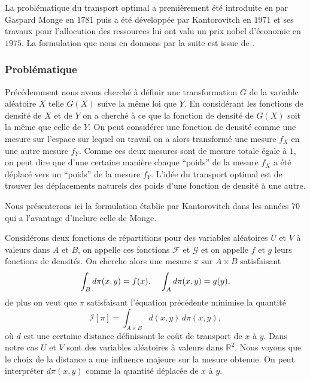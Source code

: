 \documentclass[a4paper,11pt]{article}
\numberwithin{equation}{section}
\begin{document}
La problématique du transport optimal a premièrement été introduite en par Gaspard Monge en 1781 puis a été développée par Kantorovitch en $1971$ et ses travaux pour l'allocution des ressources lui ont valu un prix nobel d'économie en $1975$. La formulation que nous en donnons par la suite est issue de \cite{villani2003topics}.

\subsubsection{Problématique}
\label{ch:s-Problematique}

Précédemment nous avons cherché à définir une transformation $G$ de la variable aléatoire $X$ telle $G(X)$ suive la même loi que $Y$. En considérant les fonctions de densité de $X$ et de $Y$ on a cherché à ce que la fonction de densité de $G(X)$ soit la même que celle de $Y$. On peut considérer une fonction de densité comme une mesure sur l'espace sur lequel on travail on a alors transformé une mesure $f_X$ en une autre mesure $f_Y$. Comme ces deux mesures sont de mesure totale égale à $1$, on peut dire que d'une certaine manière chaque ``poids'' de la mesure $f_X$ a été déplacé vers un ``poids'' de la mesure $f_Y$. L'idée du transport optimal est de trouver les déplacements naturels des poids d'une fonction de densité à une autre.  

Nous présenterons ici la formulation établie par Kantorovitch dans les années $70$ qui a l'avantage d'inclure celle de Monge.

Considérons deux fonctions de répartitions pour des variables aléatoires $U$ et $V$ à valeurs dans $A$ et $B$, on appelle ces fonctions $\mathcal{F}$ et $\mathcal{G}$ et on appelle $f$ et $g$ leurs fonctions de densités. On cherche alors une mesure $\pi$ sur  $A \times B$ satisfaisant
\[\int_{B} d\pi(x,y)= f(x), \hspace{4mm} \int_{A}  d \pi(x,y)= g(y),\]
de plus on veut que $\pi$ satisfaisant l'équation précédente minimise la quantité
\[\mathcal{I}[\pi]=\int_{A \times B}d(x,y) \, d\pi(x,y),\]
où $d$ est une certaine distance définissant le coût de transport de $x$ à $y$. Dans notre cas $U$ et $V$ sont des variables aléatoires à valeurs dans $\mathbb{R}^2$. Nous voyons que le choix de la distance a une influence majeure sur la mesure obtenue. On peut interpréter $d\pi(x,y)$ comme la quantité déplacée de $x$ à $y$.
\end{document}
